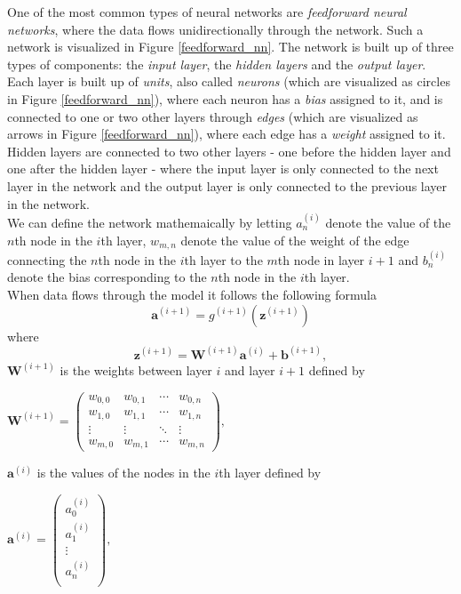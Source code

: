 \documentclass[./main.tex]{subfiles}
\begin{document}
One of the most common types of neural networks are \textit{feedforward neural networks}, where the data flows unidirectionally through the network. Such a network is visualized in Figure \ref{feedforward_nn}. The network is built up of three types of components: the \textit{input layer}, the \textit{hidden layers} and the \textit{output layer}. Each layer is built up of \textit{units}, also called \textit{neurons} (which are visualized as circles in Figure \ref{feedforward_nn}), where each neuron has a \textit{bias} assigned to it, and is connected to one or two other layers through \textit{edges} (which are visualized as arrows in Figure \ref{feedforward_nn}), where each edge has a \textit{weight} assigned to it. Hidden layers are connected to two other layers - one before the hidden layer and one after the hidden layer - where the input layer is only connected to the next layer in the network and the output layer is only connected to the previous layer in the network. \\
We can define the network mathemaically by letting $a_n ^{(i)}$ denote the value of the $n$th node in the $i$th layer, $w_{m, n}$ denote the value of the weight of the edge connecting the $n$th node in the $i$th layer to the $m$th node in layer $i + 1$ and $b_n ^{(i)}$ denote the bias corresponding to the $n$th node in the $i$th layer. \\
When data flows through the model it follows the following formula
$$\bm{a}^{(i + 1)} = g^{(i + 1)} \left( \bm{z}^{(i + 1)} \right)$$
where
$$\bm{z}^{(i + 1)} = \bm{W}^{(i + 1)} \bm{a}^{(i)} + \bm{b}^{(i + 1)},$$
$\bm{W}^{(i + 1)}$ is the weights between layer $i$ and layer $i + 1$ defined by
\begin{center}
    \begin{math}
        \bm{W}^{(i + 1)} =
        \begin{pmatrix}
            w_{0, 0} & w_{0, 1} & \cdots & w_{0, n} \\
            w_{1, 0} & w_{1, 1} & \cdots & w_{1, n} \\
            \vdots & \vdots & \ddots & \vdots \\
            w_{m, 0} & w_{m, 1} & \cdots & w_{m, n}
        \end{pmatrix}
        ,
    \end{math}
\end{center}
$\bm{a}^{(i)}$ is the values of the nodes in the $i$th layer defined by
\begin{center}
    \begin{math}
        \bm{a}^{(i)} =
        \begin{pmatrix}
            a_{0} ^{(i)} \\
            a_{1} ^{(i)} \\
            \vdots \\
            a_{n} ^{(i)} \\
        \end{pmatrix}
        ,
    \end{math}
\end{center}
\end{document}
